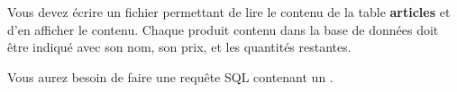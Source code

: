 

\vspace*{0.7cm}

\noindent {}

\bigskip

\noindent Vous devez écrire un fichier  permettant de lire le contenu de la table \textbf{articles} et d'en afficher le contenu.
Chaque produit contenu dans la base de données doit être indiqué avec son nom, son prix, et les quantités restantes.

\medskip

\noindent Vous aurez besoin de faire une requête SQL contenant un .
